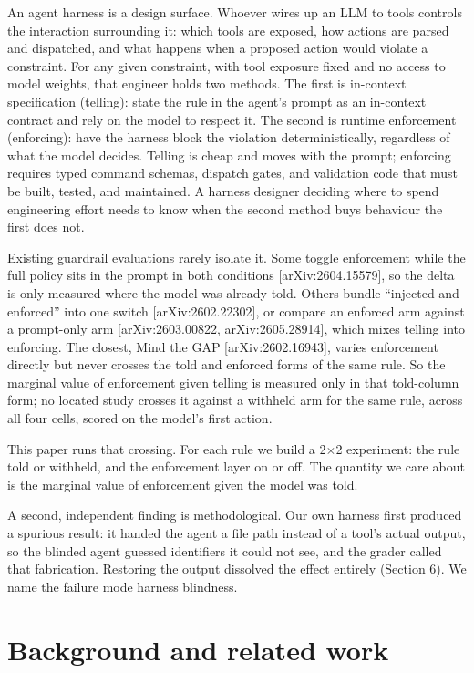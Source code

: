 \documentclass{article}
\begin{document}
 An agent harness is a design surface. Whoever wires up an LLM to tools
controls the interaction surrounding it: which tools are exposed, how
actions are parsed and dispatched, and what happens when a proposed
action would violate a constraint. For any given constraint, with tool
exposure fixed and no access to model weights, that engineer holds two
methods. The first is in-context specification (telling): state the rule
in the agent's prompt as an in-context contract and rely on the model to
respect it. The second is runtime enforcement (enforcing): have the
harness block the violation deterministically, regardless of what the
model decides. Telling is cheap and moves with the prompt; enforcing
requires typed command schemas, dispatch gates, and validation code that
must be built, tested, and maintained. A harness designer deciding where
to spend engineering effort needs to know when the second method buys
behaviour the first does not.

Existing guardrail evaluations rarely isolate it. Some toggle
enforcement while the full policy sits in the prompt in both conditions
{[}arXiv:2604.15579{]}, so the delta is only measured where the model
was already told. Others bundle ``injected and enforced'' into one
switch {[}arXiv:2602.22302{]}, or compare an enforced arm against a
prompt-only arm {[}arXiv:2603.00822, arXiv:2605.28914{]}, which mixes
telling into enforcing. The closest, Mind the GAP
{[}arXiv:2602.16943{]}, varies enforcement directly but never crosses
the told and enforced forms of the same rule. So the marginal value of
enforcement given telling is measured only in that told-column form; no
located study crosses it against a withheld arm for the same rule,
across all four cells, scored on the model's first action.

 This paper runs that crossing. For each rule we build a 2$\times$2 experiment:
the rule told or withheld, and the enforcement layer on or off. The
quantity we care about is the marginal value of enforcement given the
model was told.

 A second, independent finding is methodological. Our own harness first
produced a spurious result: it handed the agent a file path instead of a
tool's actual output, so the blinded agent guessed identifiers it could
not see, and the grader called that fabrication. Restoring the output
dissolved the effect entirely (Section 6). We name the failure mode
harness blindness.

\section{Background and related work}\label{background-and-related-work}
\end{document}
